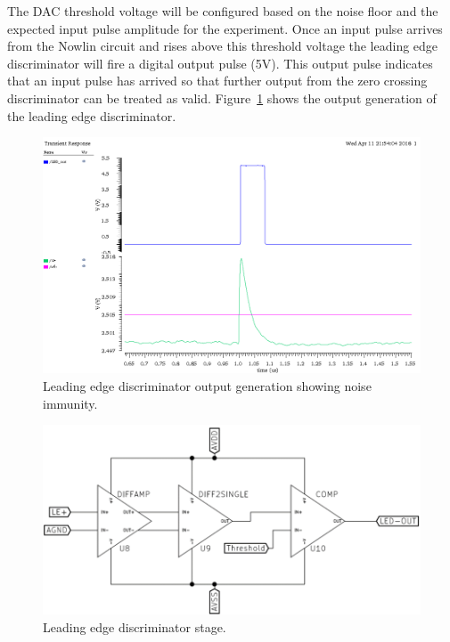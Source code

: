 \documentclass[12pt,oneside,final]{siuethesis}
\theoremstyle{definition}
\begin{document}
\par The DAC threshold voltage will be configured based on the noise floor and the expected input pulse amplitude for the experiment. Once an input pulse arrives from the Nowlin circuit and rises above this threshold voltage the leading edge discriminator will fire a digital  output pulse (5V). This output pulse indicates that an input pulse has arrived so that further output from the zero crossing discriminator can be treated as valid. Figure~\ref{fig:ledout} shows the output generation of the leading edge discriminator.
\begin{figure}[ht]
\centering
\includegraphics[scale=.4,keepaspectratio=true]{data/led_noise.png} 
\caption{Leading edge discriminator output generation showing noise immunity.}
\label{fig:ledout}
\end{figure}
\begin{figure}[ht]
\centering
\includegraphics[scale=.5,keepaspectratio=true]{images/led_circuit.png} 
\caption{Leading edge discriminator stage.}
\label{fig:LED}
\end{figure}
\end{document}
